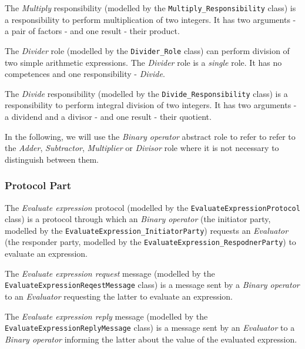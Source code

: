 The \textit{Multiply} responsibility (modelled by the \texttt{Multiply\_Responsibility} class) is a responsibility to perform multiplication of two integers.
It has two arguments - a pair of factors - and one result - their product.

The \textit{Divider} role (modelled by the \texttt{Divider\_Role} class) can perform division of two simple arithmetic expressions.
The \textit{Divider} role is a \textit{single} role.
It has no competences and one responsibility - \textit{Divide}. 

The \textit{Divide} responsibility (modelled by the \texttt{Divide\_Responsibility} class) is a responsibility to perform integral division of two integers.
It has two arguments - a dividend and a divisor - and one result - their quotient.

In the following, we will use the \textit{Binary operator} abstract role to refer to refer to the \textit{Adder}, \textit{Subtractor}, \textit{Multiplier} or \textit{Divisor} role where it is not necessary to distinguish between them.

\subsubsection*{Protocol Part}

The \textit{Evaluate expression} protocol (modelled by the \texttt{EvaluateExpressionProtocol} class) is a protocol through which an \textit{Binary operator} (the initiator party, modelled by the \texttt{EvaluateExpression\_InitiatorParty}) requests an \textit{Evaluator} (the responder party, modelled by the \texttt{EvaluateExpression\_RespodnerParty}) to evaluate an expression.

The \textit{Evaluate expression request} message (modelled by the \texttt{EvaluateExpressionReqestMessage} class) is a message sent by a \textit{Binary operator} to an \textit{Evaluator} requesting the latter to evaluate an expression.

The \textit{Evaluate expression reply} message (modelled by the \texttt{EvaluateExpressionReplyMessage} class) is a message sent by an \textit{Evaluator} to a \textit{Binary operator} informing the latter about the value of the evaluated expression.

